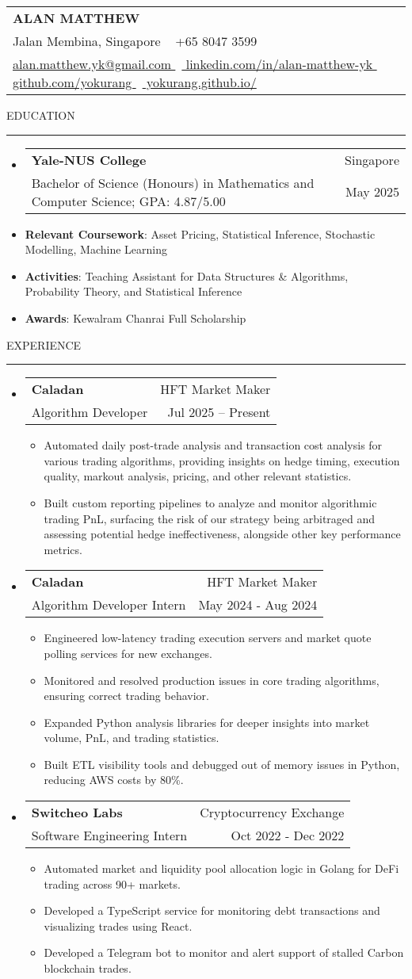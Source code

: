 \documentclass[letterpaper, 11pt]{article}
\makeatletter
\def\sectionlineskip{\medskip}
\def\sectionskip{\medskip}
\def\namesize{\LARGE}
\newcommand{\ResumeHeader}[6]{
  \noindent
  \begin{tabularx}{\textwidth}{>{\centering\arraybackslash}X}
    \namesize\MakeUppercase{\textbf{\fullname}} \\
    #1 \textbar\ #2 \\
    #3 \textbar\ #4 \textbar\ #5 \textbar\ #6 \\
  \end{tabularx}
}
\def \fullname { Alan Matthew }
\def \linkedinlink { https://www.linkedin.com/in/alan-matthew-yk }
\def \linkedintext { linkedin.com/in/alan-matthew-yk }
\def \phonenumber { +65 8047 3599 }
\def \githublink { https://github.com/yokurang }
\def \githubtext { github.com/yokurang }
\def \emaillink { mailto:alan.matthew.yk@gmail.com }
\def \emailtext { alan.matthew.yk@gmail.com }
\def \websitelink { https://yokurang.github.io/ }
\def \websitetext { yokurang.github.io/ }
\def \address { 9 Jalan Membina, Singapore }
\def \headertype {\ResumeHeader}
\def \linkedin {\href{\linkedinlink}{\linkedintext}}
\def \phone {{\phonenumber}}
\def \email {\href{\emaillink}{\emailtext}}
\def \github {\href{\githublink}{\githubtext}}
\def \website {\href{\websitelink}{\websitetext}}
\newcommand{\SectionHeading}[1]{
  \sectionskip
  \raggedright\raggedbottom\MakeUppercase{\large{#1}}
  \sectionlineskip
  \hrule
  \color{black}
}
\newcommand{\ResumeEntryTSDL}[4]{
  \vspace{1pt}\item
    \begin{tabular*}{\textwidth}[t]{l@{\extracolsep{\fill}}r} 
      \textbf{#1} & #2 \\
      #3 & #4 \\
    \end{tabular*}\vspace{-2.835pt} %
}
\newcommand{\ResumeItem}[2]{
  \item{
    \textbf{#1}{: #2 \vspace{-2.835pt}}
  }
}
\newcommand{\ResumeItemDefault}[1]{
  \item{
    #1 \vspace{-2.835pt}
  }
}
\newcommand{\ResumeSubItem}[2]{\ResumeItem{#1}{#2}\vspace{-2.835pt}}
\newcommand{\ResumeEntryStart}{\begin{itemize}[leftmargin=0mm, label={}]}
\newcommand{\ResumeEntryEnd}{\end{itemize}\vspace{-2.835pt}} %
\newcommand{\ResumeItemListStart}{\begin{itemize}[leftmargin=5mm, label=$\bullet$, itemsep=1mm, parsep=1mm]} %
\newcommand{\ResumeItemListEnd}{\end{itemize}}
\makeatother
\begin{document}
  \headertype{\address}{\phone}{\email}{\linkedin}{\github}{\website}
  
  \SectionHeading{Education}
  \ResumeEntryStart
    \ResumeEntryTSDL{Yale-NUS College} {Singapore}
    {Bachelor of Science (Honours) in Mathematics and Computer Science; GPA: 4.87/5.00} {May 2025}
    \ResumeSubItem{Relevant Coursework}{Asset Pricing, Statistical Inference, Stochastic Modelling, Machine Learning}
    \ResumeSubItem{Activities}{Teaching Assistant for Data Structures \& Algorithms, Probability Theory, and Statistical Inference}
    \ResumeSubItem{Awards}{Kewalram Chanrai Full Scholarship}
  \ResumeEntryEnd

  \vspace{5pt}

  \SectionHeading{Experience}

  \ResumeEntryStart
  \ResumeEntryTSDL{Caladan}{HFT Market Maker}{Algorithm Developer}{Jul 2025 – Present}
  \ResumeItemListStart
  \ResumeItemDefault{Automated daily post-trade analysis and transaction cost analysis for various trading algorithms, providing insights on hedge timing, execution quality, markout analysis, pricing, and other relevant statistics.}
  \ResumeItemDefault{Built custom reporting pipelines to analyze and monitor algorithmic trading PnL, surfacing the risk of our strategy being arbitraged and assessing potential hedge ineffectiveness, alongside other key performance metrics.}
  \ResumeItemListEnd
  \ResumeEntryEnd

  \ResumeEntryStart
  \ResumeEntryTSDL{Caladan}{HFT Market Maker}{Algorithm Developer Intern}{May 2024 - Aug 2024}
  \ResumeItemListStart
  \ResumeItemDefault{Engineered low-latency trading execution servers and market quote polling services for new exchanges.}
  \ResumeItemDefault{Monitored and resolved production issues in core trading algorithms, ensuring correct trading behavior.}
  \ResumeItemDefault{Expanded Python analysis libraries for deeper insights into market volume, PnL, and trading statistics.}
  \ResumeItemDefault{Built ETL visibility tools and debugged out of memory issues in Python, reducing AWS costs by 80\%.}
  \ResumeItemListEnd
  \ResumeEntryEnd

  \ResumeEntryStart
    \ResumeEntryTSDL{Switcheo Labs}{Cryptocurrency Exchange}{Software Engineering Intern}{Oct 2022 - Dec 2022}
    \ResumeItemListStart
    \ResumeItemDefault{Automated market and liquidity pool allocation logic in Golang for DeFi trading across 90+ markets.}
    \ResumeItemDefault{Developed a TypeScript service for monitoring debt transactions and visualizing trades using React.}
    \ResumeItemDefault{Developed a Telegram bot to monitor and alert support of stalled Carbon blockchain trades.}
    \ResumeItemListEnd
  \ResumeEntryEnd
\end{document}
